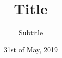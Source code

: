 \documentclass[ipa,teamwork]{docstyle/IDSCreport}
\title{Title}
\subtitle{Subtitle}
\date{31st of May, 2019}
\begin{document}







\appendix{}

\end{document}
